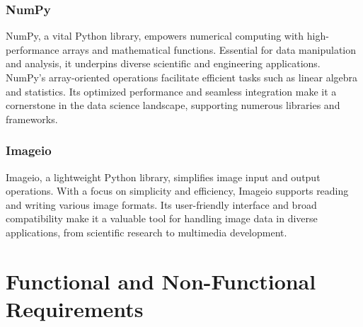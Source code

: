 \subsubsection{NumPy}
NumPy, a vital Python library, empowers numerical computing with high-performance arrays and mathematical functions. Essential for data manipulation and analysis, it underpins diverse scientific and engineering applications. NumPy's array-oriented operations facilitate efficient tasks such as linear algebra and statistics. Its optimized performance and seamless integration make it a cornerstone in the data science landscape, supporting numerous libraries and frameworks.
\subsubsection{Imageio}
Imageio, a lightweight Python library, simplifies image input and output operations. With a focus on simplicity and efficiency, Imageio supports reading and writing various image formats. Its user-friendly interface and broad compatibility make it a valuable tool for handling image data in diverse applications, from scientific research to multimedia development.

\section{Functional and Non-Functional Requirements}
